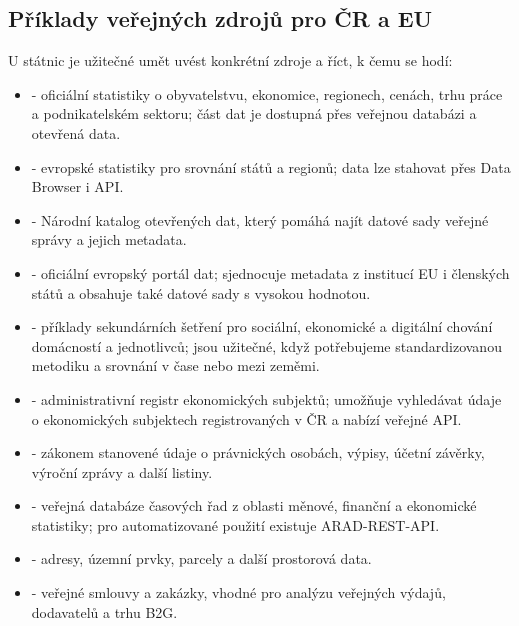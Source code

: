 \subsection{Příklady veřejných zdrojů pro ČR a EU}
U státnic je užitečné umět uvést konkrétní zdroje a říct, k čemu se hodí:
\begin{itemize}
  \item {} - oficiální statistiky o obyvatelstvu, ekonomice, regionech, cenách, trhu práce
  a podnikatelském sektoru; část dat je dostupná přes veřejnou databázi a otevřená data.
  \item {} - evropské statistiky pro srovnání států a regionů; data lze stahovat přes
  Data Browser i API.
  \item {} - Národní katalog otevřených dat, který pomáhá najít datové sady veřejné
  správy a jejich metadata.
  \item {} - oficiální evropský portál dat; sjednocuje metadata z institucí EU
  i členských států a obsahuje také datové sady s vysokou hodnotou.
  \item {} - příklady sekundárních šetření pro sociální, ekonomické a
  digitální chování domácností a jednotlivců; jsou užitečné, když potřebujeme standardizovanou
  metodiku a srovnání v čase nebo mezi zeměmi.
  \item {} - administrativní registr ekonomických subjektů; umožňuje vyhledávat údaje
  o ekonomických subjektech registrovaných v ČR a nabízí veřejné API.
  \item {} - zákonem stanovené údaje o právnických osobách,
  výpisy, účetní závěrky, výroční zprávy a další listiny.
  \item {} - veřejná databáze časových řad z oblasti měnové, finanční a ekonomické
  statistiky; pro automatizované použití existuje ARAD-REST-API.
  \item {} - adresy, územní prvky, parcely a další prostorová data.
  \item {} - veřejné smlouvy a zakázky, vhodné
  pro analýzu veřejných výdajů, dodavatelů a trhu B2G.
\end{itemize}

